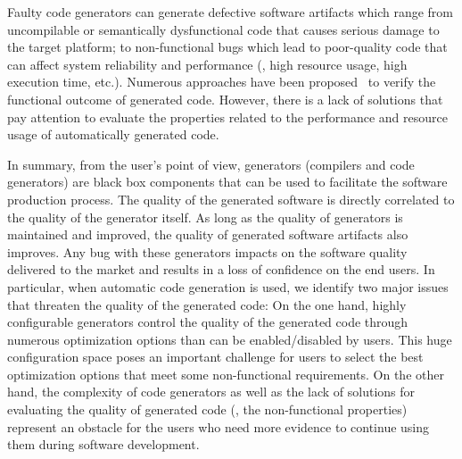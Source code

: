 Faulty code generators can generate defective software artifacts which range from uncompilable or semantically dysfunctional code that causes serious damage to the target platform; to non-functional bugs which lead to poor-quality code that can affect system reliability and performance (\eg, high resource usage, high execution time, etc.).
Numerous approaches have been proposed~\cite{stuermer2007systematic,yang2011finding} to verify the functional outcome of generated code. However, there is a lack of solutions that pay attention to evaluate the properties related to the performance and resource usage of automatically generated code. 



In summary, from the user's point of view, generators (compilers and code generators) are black box components that can be used to facilitate the software production process. The quality of the generated software is directly correlated to the quality of the generator itself. As long as the quality of generators is maintained and improved, the quality of generated software artifacts also improves. Any bug with these generators impacts on the software quality delivered to the market and results in a loss of confidence on the end users.
In particular, when automatic code generation is used, we identify two major issues that threaten the quality of the generated code:
On the one hand, highly configurable generators control the quality of the generated code through numerous optimization options than can be enabled/disabled by users. This huge configuration space poses an important challenge for users to select the best optimization options that meet some non-functional requirements.
On the other hand, the complexity of code generators as well as the lack of solutions for evaluating the quality of generated code (\ie, the non-functional properties) represent an obstacle for the users who need more evidence to continue using them during software development.



